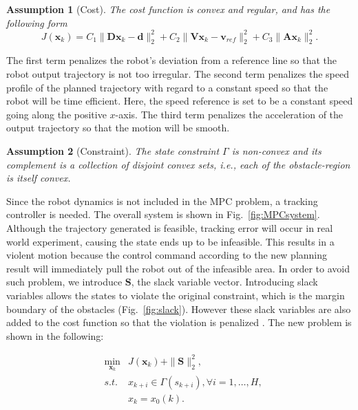 \documentclass[letterpaper, 10 pt, conference]{ieeeconf}  %
\newtheorem{assumption}{Assumption}
\begin{document}
\begin{assumption}[Cost]
The cost function is convex and regular, and has the following form
\begin{equation}
J(\mathbf{x}_k) = C_1\|\mathbf{D}\mathbf{x}_k-\mathbf{d}\|_{2}^2 + C_2 \|\mathbf{V}\mathbf{x}_k-\mathbf{v}_{ref}\|_2^2 +C_3\|\mathbf{A}\mathbf{x}_{k}\|_2^2.  
\end{equation}
\end{assumption}

The first term penalizes the robot's deviation from a reference line so that the robot output trajectory is not too irregular. The second term penalizes the speed profile of the planned trajectory with regard to a constant speed so that the robot will be time efficient. Here, the speed reference is set to be a constant speed going along the positive $x$-axis. The third term penalizes the acceleration of the output trajectory so that the motion will be smooth.

\begin{assumption}[Constraint]
The state constraint $\Gamma$ is non-convex and its complement is a collection of disjoint convex sets, i.e., each of the obstacle-region is itself convex.
\end{assumption}

Since the robot dynamics is not included in the MPC problem, a tracking controller is needed. The overall system is shown in Fig.~\ref{fig:MPCsystem}. Although the trajectory generated is feasible, tracking error will occur in real world experiment, causing the state ends up to be infeasible. This results in a violent motion because the control command according to the new planning result will immediately pull the robot out of the infeasible area. In order to avoid such problem, we introduce  $\mathbf{S}$, the slack variable vector. Introducing slack variables allows the states to violate the original constraint, which is the margin boundary of the obstacles (Fig.~\ref{fig:slack}). However these slack variables are also added to the cost function so that the violation is penalized \cite{chen2018foad}. The new problem is shown in the following:

\begin{eqnarray}
&\min_{\mathbf{x}_{k}} & J(\mathbf{x}_k) + \|\mathbf{S}\|_{2}^2 ,\\
&s.t.& x_{k+i} \in\Gamma(s_{k+i}),\forall i=1,\ldots,H,\\
&&         x_{k}=x_0(k).
\end{eqnarray} 
\end{document}
